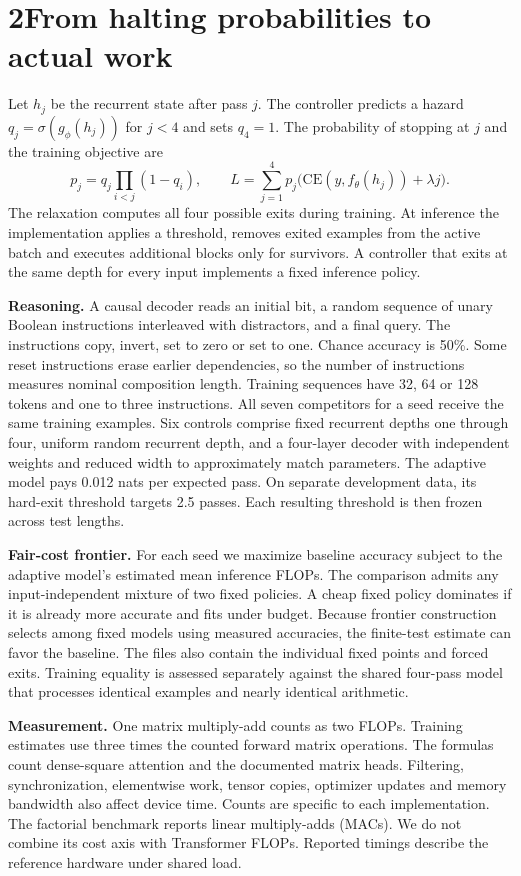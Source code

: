 \documentclass[11pt,letterpaper]{article}
\newcommand{\topic}[1]{\par\medskip\noindent\textbf{#1}\enspace}
\begin{document}
\section*{2\quad From halting probabilities to actual work}
Let $h_j$ be the recurrent state after pass $j$. The controller predicts a hazard $q_j=\sigma(g_\phi(h_j))$ for $j<4$ and sets $q_4=1$. The probability of stopping at $j$ and the training objective are
\[
p_j=q_j\prod_{i<j}(1-q_i),\qquad
L=\sum_{j=1}^4 p_j\bigl(\mathrm{CE}(y,f_\theta(h_j))+\lambda j\bigr).
\]
The relaxation computes all four possible exits during training. At inference the implementation applies a threshold, removes exited examples from the active batch and executes additional blocks only for survivors. A controller that exits at the same depth for every input implements a fixed inference policy.

\topic{Reasoning.} A causal decoder reads an initial bit, a random sequence of unary Boolean instructions interleaved with distractors, and a final query. The instructions copy, invert, set to zero or set to one. Chance accuracy is 50\%. Some reset instructions erase earlier dependencies, so the number of instructions measures nominal composition length. Training sequences have 32, 64 or 128 tokens and one to three instructions. All seven competitors for a seed receive the same training examples. Six controls comprise fixed recurrent depths one through four, uniform random recurrent depth, and a four-layer decoder with independent weights and reduced width to approximately match parameters. The adaptive model pays 0.012 nats per expected pass. On separate development data, its hard-exit threshold targets 2.5 passes. Each resulting threshold is then frozen across test lengths.

\topic{Fair-cost frontier.} For each seed we maximize baseline accuracy subject to the adaptive model's estimated mean inference FLOPs. The comparison admits any input-independent mixture of two fixed policies. A cheap fixed policy dominates if it is already more accurate and fits under budget. Because frontier construction selects among fixed models using measured accuracies, the finite-test estimate can favor the baseline. The files also contain the individual fixed points and forced exits. Training equality is assessed separately against the shared four-pass model that processes identical examples and nearly identical arithmetic.

\topic{Measurement.} One matrix multiply-add counts as two FLOPs. Training estimates use three times the counted forward matrix operations. The formulas count dense-square attention and the documented matrix heads. Filtering, synchronization, elementwise work, tensor copies, optimizer updates and memory bandwidth also affect device time. Counts are specific to each implementation. The factorial benchmark reports linear multiply-adds (MACs). We do not combine its cost axis with Transformer FLOPs. Reported timings describe the reference hardware under shared load.
\end{document}
